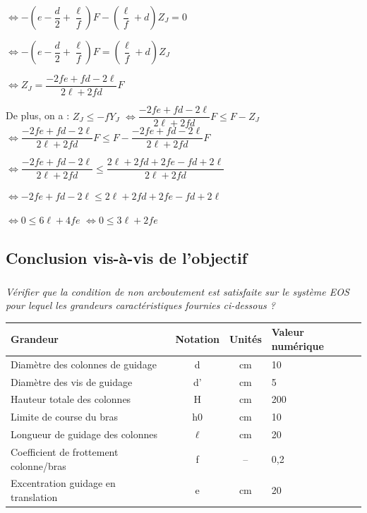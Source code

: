 \documentclass[10pt,fleqn]{article} %
\begin{document}
\begin{multicols}{2}
\begin{corrige}
 $\Leftrightarrow -\left(e-\dfrac{d}{2} + \dfrac{ \ell}{f} \right)F -\left( \dfrac{\ell }{f}+d \right)Z_J = 0$
 
 $\Leftrightarrow -\left(e-\dfrac{d}{2} + \dfrac{ \ell}{f} \right)F =\left( \dfrac{\ell }{f}+d \right)Z_J $
 
 $ \Leftrightarrow Z_J = \dfrac{-2fe+fd - 2\ell}{2\ell +2fd} F  $
 
 
 De plus, on a : 
$ Z_J\leq -fY_J$ 
$\Leftrightarrow \dfrac{-2fe+fd - 2\ell}{2\ell +2fd} F  \leq   F-Z_J $ 
$\Leftrightarrow \dfrac{-2fe+fd - 2\ell}{2\ell +2fd} F  \leq   F- \dfrac{-2fe+fd - 2\ell}{2\ell +2fd} F  $ 

$\Leftrightarrow \dfrac{-2fe+fd - 2\ell}{2\ell +2fd}   \leq   \dfrac{2\ell +2fd+2fe-fd + 2\ell}{2\ell +2fd}   $ 

$\Leftrightarrow -2fe+fd - 2\ell   \leq   2\ell +2fd+2fe-fd + 2\ell $ 

$\Leftrightarrow 0    \leq   6\ell +4fe $ 
$\Leftrightarrow 0    \leq   3\ell +2fe $ 
\end{corrige}
\else
\fi


\subsection*{Conclusion vis-à-vis de l'objectif}
\subparagraph{}\textit{Vérifier que la condition de non arcboutement est satisfaite sur le système EOS pour lequel les grandeurs caractéristiques fournies ci-dessous ?}
\ifprof
\begin{corrige}
\end{corrige}
\else
\fi




\footnotesize
\noindent\begin{center}
\begin{tabular}{|p{2.6cm}|c|c|p{1.5cm}|}
\hline
Grandeur & Notation & Unités & Valeur numérique \\ \hline
Diamètre des colonnes  de guidage & d & cm & 10 \\ \hline
Diamètre des vis de guidage & d' & cm & 5 \\ \hline
Hauteur totale des colonnes & H & cm & 200 \\ \hline
Limite de course du bras & h0 & cm & 10 \\ \hline
Longueur de guidage des colonnes & $\ell$  & cm & 20 \\ \hline
Coefficient de frottement colonne/bras & f & -- & 0,2 \\ \hline
Excentration guidage en translation & e & cm & 20 \\ \hline
\end{tabular}
\end{center}

\normalsize


\end{multicols}
 
\end{document}
